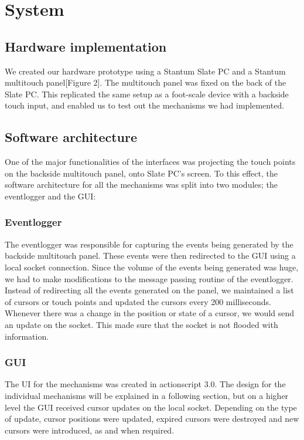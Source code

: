 \section{System}

\subsection{Hardware implementation}

We created our hardware prototype using a Stantum Slate PC and a Stantum
multitouch panel[Figure 2]. The multitouch panel was fixed on the back
of the Slate PC. This replicated the same setup as a foot-scale device
with a backside touch input, and enabled us to test out the mechanisms
we had implemented.

\subsection{Software architecture}

One of the major functionalities of the interfaces was projecting the
touch points on the backside multitouch panel, onto Slate PC's
screen. To this effect, the software architecture for all the
mechanisms was split into two modules; the eventlogger and the GUI:

\subsubsection{Eventlogger}

The eventlogger was responsible for capturing the events being
generated by the backside multitouch panel. These events were then
redirected to the GUI using a local socket connection. Since the
volume of the events being generated was huge, we had to make
modifications to the message passing routine of the
eventlogger. Instead of redirecting all the events generated on the
panel, we maintained a list of cursors or touch points and updated the
cursors every 200 milliseconds. Whenever there was a change in the
position or state of a cursor, we would send an update on the
socket. This made sure that the socket is not flooded with
information.

\subsubsection{GUI}

The UI for the mechanisms was created in actionscript 3.0. The design
for the individual mechanisms will be explained in a following
section, but on a higher level the GUI received cursor updates on the
local socket. Depending on the type of update, cursor positions were
updated, expired cursors were destroyed and new cursors were
introduced, as and when required.
